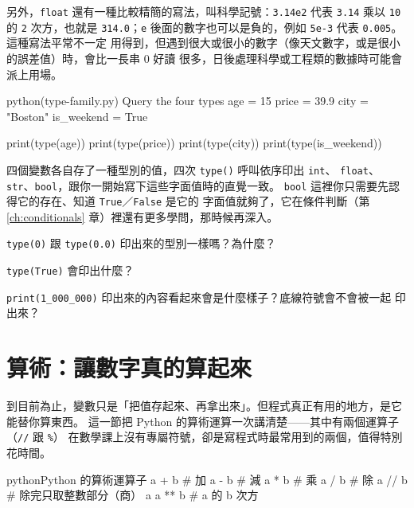 另外，\texttt{float} 還有一種比較精簡的寫法，叫科學記號：\texttt{3.14e2} 代表
\texttt{3.14} 乘以 \texttt{10} 的 \texttt{2} 次方，也就是 \texttt{314.0}；\texttt{e}
後面的數字也可以是負的，例如 \texttt{5e-3} 代表 \texttt{0.005}。這種寫法平常不一定
用得到，但遇到很大或很小的數字（像天文數字，或是很小的誤差值）時，會比一長串 0 好讀
很多，日後處理科學或工程類的數據時可能會派上用場。

\begin{example}{python}{(type-family.py) Query the four types}
age = 15
price = 39.9
city = "Boston"
is_weekend = True

print(type(age))
print(type(price))
print(type(city))
print(type(is_weekend))
\end{example}


四個變數各自存了一種型別的值，四次 \texttt{type()} 呼叫依序印出 \texttt{int}、
\texttt{float}、\texttt{str}、\texttt{bool}，跟你一開始寫下這些字面值時的直覺一致。
\texttt{bool} 這裡你只需要先認得它的存在、知道 \texttt{True}／\texttt{False} 是它的
字面值就夠了，它在條件判斷（第 \ref{ch:conditionals} 章）裡還有更多學問，那時候再深入。

\begin{drills}[label=drills:type-family-literals]
\item \texttt{type(0)} 跟 \texttt{type(0.0)} 印出來的型別一樣嗎？為什麼？
\item \texttt{type(True)} 會印出什麼？
\item \texttt{print(1\_000\_000)} 印出來的內容看起來會是什麼樣子？底線符號會不會被一起
印出來？
\end{drills}

\section{算術：讓數字真的算起來}
\label{sec:arithmetic}

到目前為止，變數只是「把值存起來、再拿出來」。但程式真正有用的地方，是它能替你算東西。
這一節把 Python 的算術運算一次講清楚——其中有兩個運算子（\texttt{//} 跟 \texttt{\%}）
在數學課上沒有專屬符號，卻是寫程式時最常用到的兩個，值得特別花時間。

\begin{code}{python}{Python 的算術運算子}
a + b       # 加
a - b       # 減
a * b       # 乘
a / b       # 除
a // b      # 除完只取整數部分（商）
a %
a ** b      # a 的 b 次方
\end{code}

